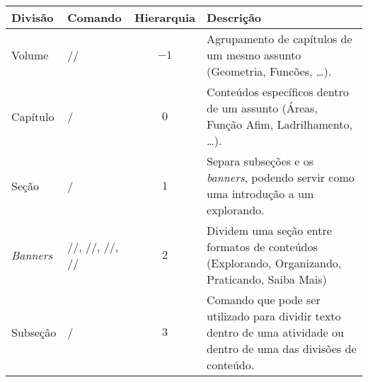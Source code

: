 \begin{table}[H]
	\centering\small
	\begin{tabular}
		{l>{\raggedright}p{.25\linewidth}cp{.40\linewidth}}
		\toprule
		Divisão            & Comando                                                                                      & Hierarquia     & Descrição                                                                                                                                            \\
		\midrule
		Volume             & \latexinline/\volume/                                                                        & \(-1\)         & Agrupamento de capítulos de um mesmo assunto (Geometria, Funcões, \ldots).                                                                           \\
		\addlinespace
		Capítulo           & \latexinline/\chapter/                                                                       & \(0\)          & Conteúdos específicos dentro de um assunto (Áreas, Função Afim, Ladrilhamento, \ldots).                                                              \\
		\addlinespace
		Seção              & \latexinline/\section/                                                                       & \(1\)          & Separa subseções e os \emph{banners}, podendo servir como uma introdução a um explorando.                                                            \\
		\addlinespace
		\emph{Banners}     & \latexinline/\explore/, \latexinline/\arrange/, \latexinline/\practice/, \latexinline/\know/ & \(2\)          & Dividem uma seção entre formatos de conteúdos (Explorando, Organizando, Praticando, Saiba Mais)                                                      \\
		Subseção           & \latexinline/\subsection/                                                                    & \(3\)          & Comando que pode ser utilizado para dividir texto dentro de uma atividade ou dentro de uma das divisões de conteúdo.                                 \\

\end{tabular}
\end{table}
